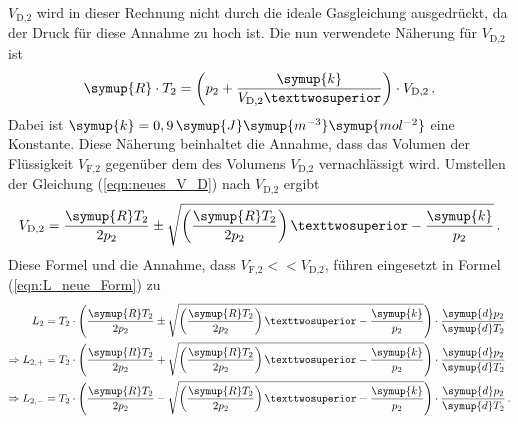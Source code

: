     $V_{\text{D,2}}$ wird in dieser Rechnung nicht durch die ideale Gasgleichung ausgedrückt, da der Druck für diese
    Annahme zu hoch ist. Die nun verwendete Näherung für $V_{\text{D,2}}$ ist
    \begin{equation}
      \symup{R} \cdot T_2 = \left(p_2 + \frac{\symup{k}}{V_{\text{D,2}}²}\right) \cdot V_{\text{D,2}} \, .
      \label{eqn:neues_V_D}
    \end{equation}
    Dabei ist $\symup{k} = 0,9 \, \symup{J}\symup{m^{-3}}\symup{mol^{-2}}$ eine Konstante. Diese Näherung 
    beinhaltet die Annahme, dass das Volumen der Flüssigkeit $V_{\text{F,2}}$ gegenüber dem des Volumens $V_{\text{D,2}}$ vernachlässigt
    wird. 
    Umstellen der Gleichung (\ref{eqn:neues_V_D}) nach $V_{\text{D,2}}$ ergibt
    \begin{equation}
      V_{\text{D,2}} = \frac{\symup{R}T_2}{2 p_2} \pm \sqrt{\left(\frac{\symup{R}T_2}{2p_2}\right)² - \frac{\symup{k}}{p_2}} \, .
    \end{equation}
    Diese Formel und die Annahme, dass $V_{\text{F,2}} << V_{\text{D,2}}$, führen eingesetzt in Formel (\ref{eqn:L_neue_Form}) zu 
    \begin{align*}
      L_2 &= T_2 \cdot \left(\frac{\symup{R}T_2}{2 p_2} \pm \sqrt{\left(\frac{\symup{R}T_2}{2p_2}\right)² - \frac{\symup{k}}{p_2}}\right) \cdot \frac{\symup{d}p_2}{\symup{d}T_2} \\
      \Rightarrow L_{2,+} &= T_2 \cdot \left(\frac{\symup{R}T_2}{2 p_2} + \sqrt{\left(\frac{\symup{R}T_2}{2p_2}\right)² - \frac{\symup{k}}{p_2}}\right) \cdot \frac{\symup{d}p_2}{\symup{d}T_2} \\
      \Rightarrow L_{2,-} &= T_2 \cdot \left(\frac{\symup{R}T_2}{2 p_2} - \sqrt{\left(\frac{\symup{R}T_2}{2p_2}\right)² - \frac{\symup{k}}{p_2}}\right) \cdot \frac{\symup{d}p_2}{\symup{d}T_2} \, .
    \end{align*}
    
